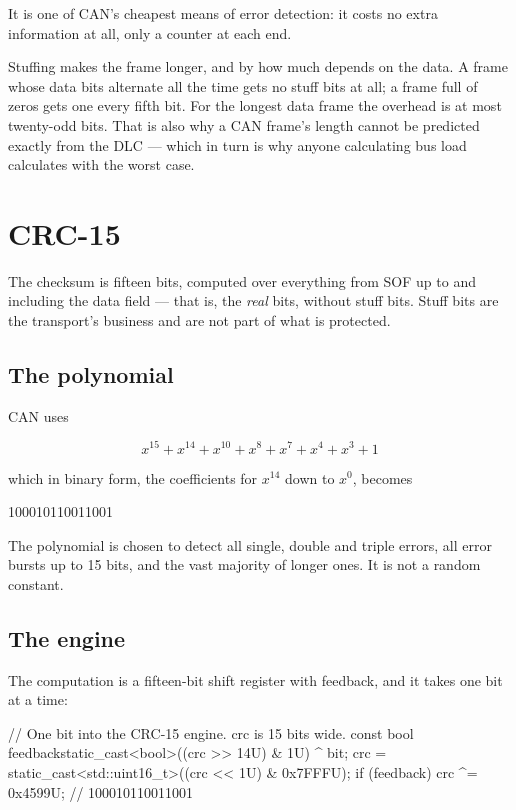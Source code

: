 It is one of CAN's cheapest means of error detection: it costs no extra information at all, only a
counter at each end.

\begin{aside}
 Stuffing makes the frame longer, and by how much depends on the data. A frame whose
data bits alternate all the time gets no stuff bits at all; a frame full of zeros gets one every
fifth bit. For the longest data frame the overhead is at most twenty-odd bits. That is also why a
CAN frame's length cannot be predicted exactly from the DLC --- which in turn is why anyone
calculating bus load calculates with the worst case.
\end{aside}

\section{CRC-15}

The checksum is fifteen bits, computed over everything from SOF up to and including the data field
--- that is, the \emph{real} bits, without stuff bits. Stuff bits are the transport's business and
are not part of what is protected.

\subsection{The polynomial}

CAN uses

\[ x^{15} + x^{14} + x^{10} + x^{8} + x^{7} + x^{4} + x^{3} + 1 \]

which in binary form, the coefficients for $x^{14}$ down to $x^{0}$, becomes

\begin{console}
100010110011001
\end{console}

The polynomial is chosen to detect all single, double and triple errors, all error bursts up to
15 bits, and the vast majority of longer ones. It is not a random constant.

\subsection{The engine}

The computation is a fifteen-bit shift register with feedback, and it takes one bit at a time:

\begin{cppcode}
// One bit into the CRC-15 engine. crc is 15 bits wide.
const bool feedback{static_cast<bool>((crc >> 14U) & 1U) ^ bit};
crc = static_cast<std::uint16_t>((crc << 1U) & 0x7FFFU);
if (feedback)
{
    crc ^= 0x4599U;   // 100010110011001
}
\end{cppcode}

